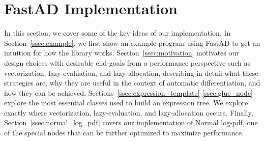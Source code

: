 \section{FastAD Implementation}

In this section, we cover some of the key ideas of our implementation.
In Section~\ref{ssec:example}, we first show an example program using FastAD
to get an intuition for how the library works.
Section~\ref{ssec:motivation} motivates our design choices with desirable end-goals
from a performance perspective such as vectorization, lazy-evaluation, and lazy-allocation,
describing in detail what these strategies are,
why they are useful in the context of automatic differentiation,
and how they can be achieved.
Sections~\ref{ssec:expression_template}-\ref{ssec:glue_node} explore the most essential classes
used to build an expression tree.
We explore exactly where vectorization, lazy-evaluation, and lazy-allocation occurs.
Finally, Section~\ref{ssec:normal_log_pdf} covers our implementation of
Normal log-pdf, one of the special nodes that can be further optimized to maximize performance.






















